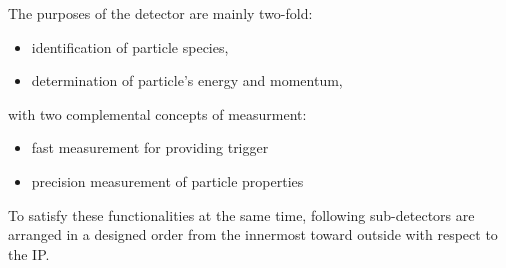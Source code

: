 The purposes of the detector are mainly two-fold:
\begin{itemize}
\item identification of particle species,
\item determination of particle's energy and momentum,
\end{itemize}
with two complemental concepts of measurment:
\begin{itemize}
\item fast measurement for providing trigger
\item precision measurement of particle properties
\end{itemize}
 
To satisfy these functionalities at the same time, following sub-detectors are arranged in a designed order from the innermost toward outside with respect to the IP.

